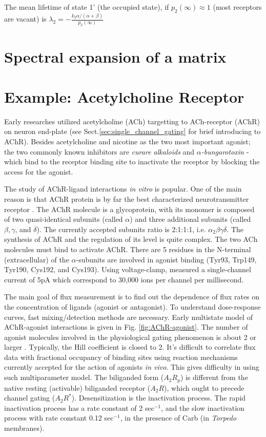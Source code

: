The mean lifetime of state 1' (the occupied state), if $p_2(\infty)\approx 1$
(most receptors are vacant) is
$\lambda_2=-\frac{k_2\alpha/(\alpha+\beta)}{p_2(\infty)}$


\section{Spectral expansion of a matrix}
\label{sec:spectr-expans-matr}


\section{Example: Acetylcholine Receptor}


Early researches utilized acetylcholine (ACh) targetting to ACh-receptor (AChR)
on neuron end-plate (see Sect.\ref{sec:single_channel_gating} for brief
introducing to AChR). Besides acetylcholine and nicotine as the two most
important agonist; the two commonly known inhibitors are {\it curare alkaloids}
and {\it $\alpha$-bungarotoxin} - which bind to the receptor binding site to
inactivate the receptor by blocking the access for the agonist.

The study of AChR-ligand interactions {\it in vitro} is popular. One of the main
reason is that AChR protein is by far the best characterized neurotransmitter
receptor \citep{barrantes1983}. The AChR molecule is a glycoprotein, with its
monomer is composed of two quasi-identical subunits (called $\alpha$) and three
additional subunits (called $\beta, \gamma$, and $\delta$). The currently
accepted subunits ratio is 2:1:1:1, i.e. $\alpha_2\beta\gamma\delta$. The
synthesis of AChR and the regulation of its level is quite complex.
The two ACh molecules must bind to activate AChR. There are 5 residues in the
N-terminal (extracellular) of the $\alpha$-subunits are involved in agonist
binding (Tyr93, Trp149, Tyr190, Cys192, and Cys193). Using voltage-clamp,
\citep{anderson1973} measured a single-channel current of 5pA which correspond
to 30,000 ions per channel per millisecond.



The main goal of flux measurement is to find out the dependence of flux rates on
the concentration of ligands (agonist or antagonist). To understand
dose-response curves, fast mixing/detection methods are necessary. Early
multistate model of AChR-agonist interactions is given in Fig.
\ref{fig:AChR-agonist}. The number of agonist molecules involved in the
physiological gating phenomenon is about 2 or larger \citep{colquhoun1979}.
Typically, the Hill coefficient is closed to 2.  It's difficult to correlate
flux data with fractional occupancy of binding sites using reaction mechanisms
currently accepted for the action of agonists {\it in vivo}. This gives
difficulty in using such multiparameter model. The biliganded form ($A_2R_p$) is
different from the native resting (activable) biliganded receptor ($A_2R$),
which ought to precede channel gating ($A_2R^*$). Desensitization is the
inactivation process. The rapid inactivation process has a rate constant of 2
sec$^{-1}$, and the slow inactivation process with rate constant 0.12
sec$^{-1}$, in the presence of Carb (in {\it Torpedo} membranes).

